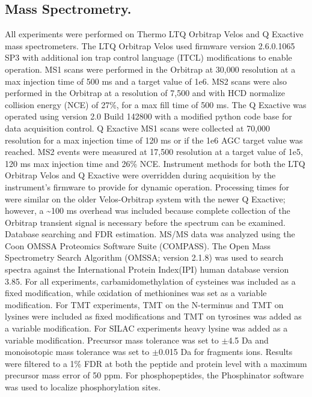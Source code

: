 \subsection{Mass Spectrometry.}
All experiments were performed on Thermo LTQ Orbitrap Velos and Q Exactive mass spectrometers. The LTQ Orbitrap Velos used firmware version 2.6.0.1065 SP3 with additional ion trap control language (ITCL) modifications to enable \inseq{} operation. MS1 scans were performed in the Orbitrap at 30,000 resolution at a max injection time of 500 ms and a target value of 1e6. MS2 scans were also performed in the Orbitrap at a resolution of 7,500 and with HCD normalize collision energy (NCE) of 27\%, for a max fill time of 500 ms. The Q Exactive was operated using version 2.0 Build 142800 with a modified python code base for \inseq{} data acquisition control. Q Exactive MS1 scans were collected at 70,000 resolution for a max injection time of 120 ms or if the 1e6 AGC target value was reached. MS2 events were measured at 17,500 resolution at a target value of 1e5, 120 ms max injection time and 26\% NCE. Instrument methods for both the LTQ Orbitrap Velos and Q Exactive were overridden during acquisition by the instrument's firmware to provide for dynamic \inseq{} operation. Processing times for \inseq{} were similar on the older Velos-Orbitrap system with the newer Q Exactive; however, a \textasciitilde100 ms overhead was included because complete collection of the Orbitrap transient signal is necessary before the spectrum can be examined.
Database searching and FDR estimation. MS/MS data was analyzed using the Coon OMSSA Proteomics Software Suite (COMPASS).\cite{compass} The Open Mass Spectrometry Search Algorithm (OMSSA; version 2.1.8) was used to search spectra against the International Protein Index(IPI) human database version 3.85.\cite{omssa} For all experiments, carbamidomethylation of cysteines was included as a fixed modification, while oxidation of methionines was set as a variable modification. For TMT experiments, TMT on the N-terminus and TMT on lysines were included as fixed modifications and TMT on tyrosines was added as a variable modification. For SILAC experiments heavy lysine was added as a variable modification. Precursor mass tolerance was set to $\pm$4.5 Da and monoisotopic mass tolerance was set to $\pm$0.015 Da for fragments ions. Results were filtered to a 1\% FDR at both the peptide and protein level with a maximum precursor mass error of 50 ppm. For phosphopeptides, the Phosphinator software was used to localize phosphorylation sites.\cite{esips}

